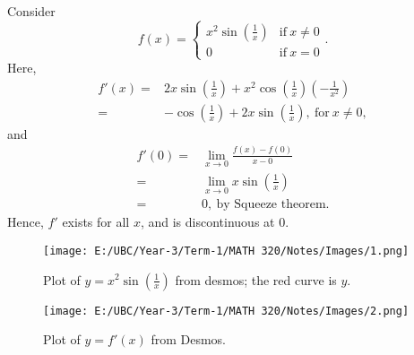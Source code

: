 \begin{example}
	Consider 
	\begin{equation*}
		f(x)=\begin{cases}
				x^2\sin{\left(\frac{1}{x}\right)}&\text{if}~x\neq 0\\
				0&\text{if}~x=0
		   	 \end{cases}.
	\end{equation*}
	Here, 
	\begin{align*}
		f'(x)=&2x\sin{\left(\frac{1}{x}\right)}+x^2\cos{\left(\frac{1}{x}\right)}\left(-\frac{1}{x^2}\right)\\
			 =&-\cos{\left(\frac{1}{x}\right)}+2x\sin{\left(\frac{1}{x}\right)},~\text{for}~x\neq 0,
	\end{align*}
	and 
	\begin{align*}
		f'(0)=&\lim_{x\to 0}\frac{f(x)-f(0)}{x-0}\\
		     =&\lim_{x\to 0}x\sin{\left(\frac{1}{x}\right)}\\
		     =&0,~\text{by Squeeze theorem.}
	\end{align*}
	Hence, \(f'\) exists for all \(x\), and is discontinuous at \(0\).
\end{example}

\begin{figure}[H]
	\centering
	\texttt{[image: E:/UBC/Year-3/Term-1/MATH 320/Notes/Images/1.png]}
	\caption{Plot of \(y=x^2\sin{\left(\displaystyle\frac{1}{x}\right)}\) from desmos; the red curve is \(y\).}
\end{figure}

\begin{figure}[H]
	\centering
	\texttt{[image: E:/UBC/Year-3/Term-1/MATH 320/Notes/Images/2.png]}
	\caption{Plot of \(y=f'(x)\) from Desmos.}
\end{figure}
